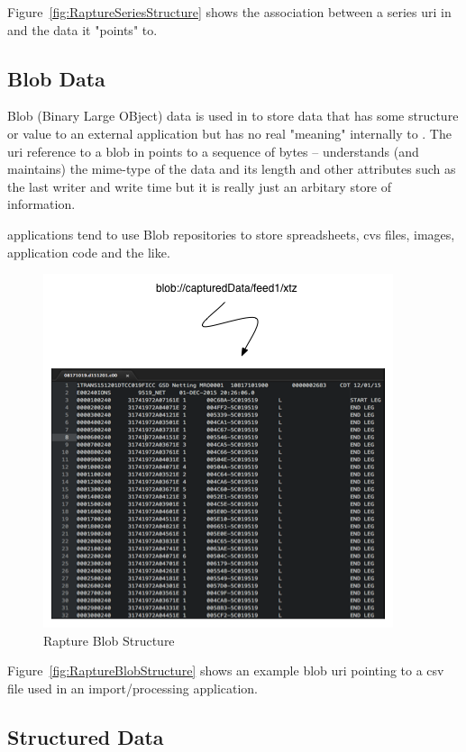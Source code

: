 Figure~\vref{fig:RaptureSeriesStructure} shows the association between a series uri in \Rapture and the data
it "points" to.

\subsection{Blob Data}

Blob (Binary Large OBject) data is used in \Rapture to store data that has some structure or value to an
external application but has no real "meaning" internally to \Rapture. The uri reference to a blob in \Rapture
points to a sequence of bytes -- \Rapture understands (and maintains) the mime-type of the data and its length
and other attributes such as the last writer and write time but it is really just an arbitary store of information.

\Rapture applications tend to use Blob repositories to store spreadsheets, cvs files, images, application code and the like.

\begin{figure}[htb]
\centering
\includegraphics[scale=0.75]{Graphics/RaptureBlobExplain}
\caption{Rapture Blob Structure}
\label{fig:RaptureBlobStructure}
\end{figure}

Figure~\vref{fig:RaptureBlobStructure} shows an example blob uri pointing to a csv file
used in an import/processing application.

\subsection{Structured Data}

